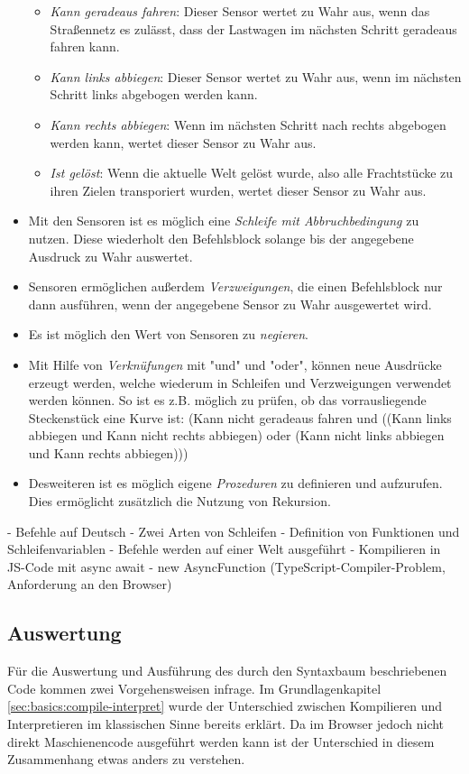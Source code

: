 \begin{itemize}
\begin{itemize}
    \item \emph{Kann geradeaus fahren}: Dieser Sensor wertet zu Wahr aus, wenn das Straßennetz es zulässt, dass der Lastwagen im nächsten Schritt geradeaus fahren kann.
    \item \emph{Kann links abbiegen}: Dieser Sensor wertet zu Wahr aus, wenn im nächsten Schritt links abgebogen werden kann.
    \item \emph{Kann rechts abbiegen}: Wenn im nächsten Schritt nach rechts abgebogen werden kann, wertet dieser Sensor zu Wahr aus.
    \item \emph{Ist gelöst}: Wenn die aktuelle Welt gelöst wurde, also alle Frachtstücke zu ihren Zielen transporiert wurden, wertet dieser Sensor zu Wahr aus.
  \end{itemize}
  \item Mit den Sensoren ist es möglich eine \emph{Schleife mit Abbruchbedingung} zu nutzen. Diese wiederholt den Befehlsblock solange bis der angegebene Ausdruck zu Wahr auswertet.
  \item Sensoren ermöglichen außerdem \emph{Verzweigungen}, die einen Befehlsblock nur dann ausführen, wenn der angegebene Sensor zu Wahr ausgewertet wird.
  \item Es ist möglich den Wert von Sensoren zu \emph{negieren}.
  \item Mit Hilfe von \emph{Verknüfungen} mit "und" und "oder", können neue Ausdrücke erzeugt werden, welche wiederum in Schleifen und Verzweigungen verwendet werden können. So ist es z.B. möglich zu prüfen, ob das vorrausliegende Steckenstück eine Kurve ist: (Kann nicht geradeaus fahren und ((Kann links abbiegen und Kann nicht rechts abbiegen) oder (Kann nicht links abbiegen und Kann rechts abbiegen)))
  \item Desweiteren ist es möglich eigene \emph{Prozeduren} zu definieren und aufzurufen. Dies ermöglicht zusätzlich die Nutzung von Rekursion.
\end{itemize}

- Befehle auf Deutsch
- Zwei Arten von Schleifen
- Definition von Funktionen und Schleifenvariablen
- Befehle werden auf einer Welt ausgeführt
- Kompilieren in JS-Code mit async await
- new AsyncFunction (TypeScript-Compiler-Problem, Anforderung an den Browser)

\subsection{Auswertung}

Für die Auswertung und Ausführung des durch den Syntaxbaum beschriebenen Code kommen zwei Vorgehensweisen infrage. Im Grundlagenkapitel \ref{sec:basics:compile-interpret} wurde der Unterschied zwischen Kompilieren und Interpretieren im klassischen Sinne bereits erklärt. Da im Browser jedoch nicht direkt Maschienencode ausgeführt werden kann ist der Unterschied in diesem Zusammenhang etwas anders zu verstehen.

